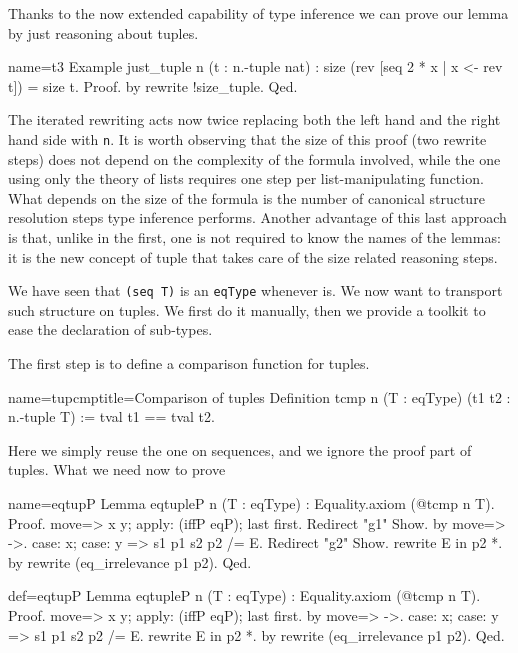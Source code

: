 Thanks to the now extended capability of type inference
we can prove our lemma by just reasoning about tuples.

\begin{coq}{name=t3}{}
Example just_tuple n (t : n.-tuple nat) :
  size (rev [seq 2 * x | x <- rev t]) = size t.
Proof. by rewrite !size_tuple. Qed.
\end{coq}

The iterated rewriting acts now twice replacing both the left hand
and the right hand side with \lstinline/n/.  It is worth observing
that the size of this proof (two rewrite steps) does not depend on the
complexity of the formula involved, while the one using only the
theory of lists requires one step per list-manipulating function.
What depends on the size of the formula is the number of canonical
structure resolution steps type inference performs.  Another advantage
of this last approach is that, unlike in the first, one
is not required to know the names of the lemmas:
it is the new concept of tuple that takes care of the size related
reasoning steps.

\label{sec:subtypekit}

We have seen that \lstinline/(seq T)/ is an \lstinline/eqType/
whenever  is.  We now want to transport such  structure
on tuples.  We first do it manually, then we provide a toolkit
to ease the declaration of sub-types.

The first step is to define a comparison function for tuples.

\begin{coq}{name=tupcmp}{title=Comparison of tuples}
Definition tcmp n (T : eqType) (t1 t2 : n.-tuple T) :=
  tval t1 == tval t2.
\end{coq}

Here we simply reuse the one on sequences, and we ignore the
proof part of tuples.  What we need now to prove

\begin{coqdef}{name=eqtupP}
Lemma eqtupleP n (T : eqType) : Equality.axiom (@tcmp n T).
Proof.
move=> x y; apply: (iffP eqP); last first.
Redirect "g1" Show.
  by move=> ->.
case: x; case: y => s1 p1 s2 p2 /= E. Redirect "g2" Show.
rewrite E in p2 *.
by rewrite (eq_irrelevance p1 p2).
Qed.
\end{coqdef}
\begin{coq}{def=eqtupP}{}
Lemma eqtupleP n (T : eqType) : Equality.axiom (@tcmp n T).
Proof.
move=> x y; apply: (iffP eqP); last first.
  by move=> ->.
case: x; case: y => s1 p1 s2 p2 /= E.
rewrite E in p2 *.
by rewrite (eq_irrelevance p1 p2).
Qed.
\end{coq}

